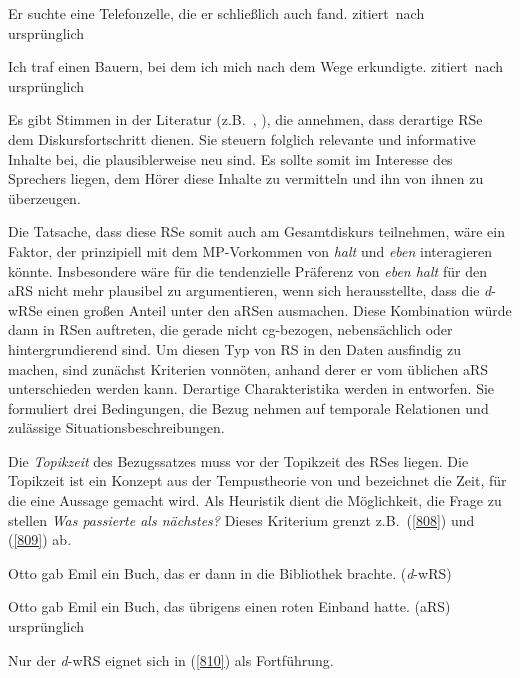 \begin{exe}
	\ex\label{806} 
	Er suchte eine Telefonzelle, die er schließlich auch fand. 
	\newline
	\hbox{}\hfill\hbox{zitiert nach \citet[4]{Brandt1990}}	
	\newline
	\hbox{}\hfill\hbox{ursprünglich \citet[672]{Duden1984}}
\end{exe}

\begin{exe}
	\ex\label{807} 
	Ich traf einen Bauern, bei dem ich mich nach dem Wege erkundigte.
	\newline
	\hbox{}\hfill\hbox{zitiert nach \citet[5]{Brandt1990}}	
	\newline
	\hbox{}\hfill\hbox{ursprünglich \citet[28]{Jung1971}}
\end{exe}				
Es gibt Stimmen in der Literatur (z.B.\ \citealt[272--273]{Lehmann1984}, \citealt[67--68]{Brandt1990}), die annehmen, dass derartige RSe dem Diskursfortschritt dienen. Sie steuern folglich relevante und informative Inhalte bei, die plausiblerweise neu sind. Es sollte somit im Interesse des Sprechers liegen, dem Hörer diese Inhalte zu vermitteln und ihn von ihnen zu überzeugen.

Die Tatsache, dass diese RSe somit auch am Gesamtdiskurs teilnehmen, wäre ein Faktor, der prinzipiell mit dem MP-Vorkommen von \textit{halt} und \textit{eben} interagieren könnte. Insbesondere wäre für die tendenzielle Präferenz von \textit{eben halt} für den aRS nicht mehr plausibel zu argumentieren, wenn sich herausstellte, dass die \textit{d}-wRSe einen großen Anteil unter den aRSen ausmachen. Diese Kombination würde dann in RSen auftreten, die gerade nicht cg-bezogen, nebensächlich oder hintergrundierend sind. Um diesen Typ von RS in den Daten ausfindig zu machen, sind zunächst Kriterien vonnöten, anhand derer er vom üblichen aRS unterschieden werden kann. Derartige Charakteristika werden in \citet[158--163]{Holler2005} entworfen. Sie formuliert drei Bedingungen, die Bezug nehmen auf temporale Relationen und zulässige Situationsbeschreibungen.

Die \textit{Topikzeit} des Bezugssatzes muss vor der Topikzeit des RSes liegen. Die Topikzeit ist ein Konzept aus der Tempustheorie von \citet{Klein1994} und bezeichnet die Zeit, für die eine Aussage gemacht wird. Als Heuristik dient die Möglichkeit, die Frage zu stellen \textit{Was passierte als nächstes?} Dieses Kriterium grenzt z.B.\ (\ref{808}) und (\ref{809}) ab.

\begin{exe}
	\ex\label{808} 
	Otto gab Emil ein Buch, das er dann in die Bibliothek brachte. (\textit{d}-wRS)
\end{exe}
\begin{exe}
	\ex\label{809} 
	Otto gab Emil ein Buch, das übrigens einen roten Einband hatte. (aRS)	
	\newline
	\hbox{}\hfill\hbox{ursprünglich \citet[158/159]{Holler2005}}
\end{exe}
Nur der \textit{d}-wRS eignet sich in (\ref{810}) als Fortführung.

